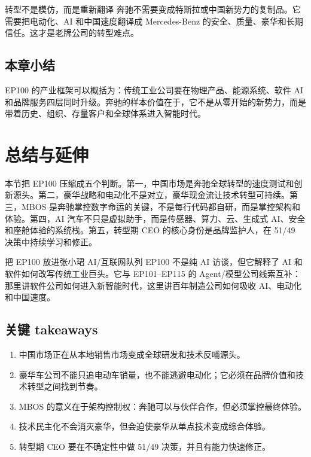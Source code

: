 \documentclass[a4paper]{article}
\begin{document}
\begin{importantbox}{转型不是模仿，而是重新翻译}
奔驰不需要变成特斯拉或中国新势力的复制品。它需要把电动化、AI 和中国速度翻译成 Mercedes-Benz 的安全、质量、豪华和长期信任。这才是老牌公司的转型难点。
\end{importantbox}

\subsection{本章小结}

EP100 的产业框架可以概括为：传统工业公司要在物理产品、能源系统、软件 AI 和品牌服务四层同时升级。奔驰的样本价值在于，它不是从零开始的新势力，而是带着历史、组织、存量客户和全球体系进入智能时代。

\section{总结与延伸}

本节把 EP100 压缩成五个判断。第一，中国市场是奔驰全球转型的速度测试和创新源头。第二，豪华战略和电动化不是对立，豪华现金流让技术转型可持续。第三，MBOS 是奔驰掌控数字命运的关键，不是每行代码都自研，而是掌控架构和体验。第四，AI 汽车不只是虚拟助手，而是传感器、算力、云、生成式 AI、安全和座舱体验的系统栈。第五，转型期 CEO 的核心身份是品牌监护人，在 51/49 决策中持续学习和修正。

\begin{importantbox}{把 EP100 放进张小珺 AI/互联网队列}
EP100 不是纯 AI 访谈，但它解释了 AI 和软件如何改写传统工业巨头。它与 EP101--EP115 的 Agent/模型公司线索互补：那里讲软件公司如何进入新智能时代，这里讲百年制造公司如何吸收 AI、电动化和中国速度。
\end{importantbox}

\subsection{关键 takeaways}

\begin{enumerate}
\item 中国市场正在从本地销售市场变成全球研发和技术反哺源头。
\item 豪华车公司不能只追电动车销量，也不能逃避电动化；它必须在品牌价值和技术转型之间找到节奏。
\item MBOS 的意义在于架构控制权：奔驰可以与伙伴合作，但必须掌控最终体验。
\item 技术民主化不会消灭豪华，但会迫使豪华从单点技术变成综合体验。
\item 转型期 CEO 要在不确定性中做 51/49 决策，并且有能力快速修正。
\end{enumerate}
\end{document}
